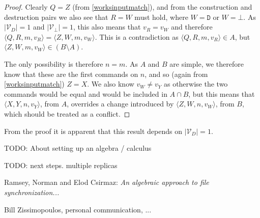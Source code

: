 \documentclass[12pt]{article}
\newcommand{\setvx}[1]{\mathcal{V}_{#1}} %
\newcommand{\setd}{\setvx{D}} %
\newcommand{\setb}{\setvx{\empt}} %
\newcommand{\empt}{\bot}
\newcommand{\ccharb}{\empt}
\newcommand{\cchard}{\mathtt{D}}
\newcommand{\valvy}{v_Y} %
\newcommand{\valvw}{v_W}
\newcommand{\valvr}{v_R}
\newcommand{\caaaa}[4]{\langle{#1,#2,#3,#4}\rangle}
\newcommand{\cxynv}{\caaaa{X}{Y}{n}{\valvy}}
\newcommand{\czwnv}{\caaaa{Z}{W}{n}{\valvw}}
\newcommand{\czwmv}{\caaaa{Z}{W}{m}{\valvw}}
\newcommand{\cqrmv}{\caaaa{Q}{R}{m}{\valvr}}
\newcommand{\bma}{(B\setminus A)}
\theoremstyle{definition}
\begin{document}
\begin{proof}
Clearly $Q=Z$ (from \cref{worksinputmatch}), and from the construction and destruction
pairs we also see that $R=W$ must hold, where $W=\cchard$ or $W=\ccharb$.
As $|\setd|=1$ and $|\setb|=1$, this also means that $v_R=v_W$ and therefore
$\cqrmv = \czwmv$.
This is a contradiction as $\cqrmv\in A$, but $\czwmv\in\bma$.

The only possibility is therefore $n=m$.
As $A$ and $B$ are simple, we therefore know that these are the first commands on $n$,
and so (again from \cref{worksinputmatch}) $Z=X$.
We also know $\valvw\neq\valvy$ as otherwise the two commands would be equal and
would be included in $A\cap B$,
but this means that $\cxynv$, from $A$, overrides a change introduced 
by $\czwnv$, from $B$, which should be treated as a conflict.
\end{proof}

From the proof it is apparent that this result depends on $|\setd|=1$.


TODO: About setting up an algebra / calculus

TODO: next steps. multiple replicas

\begin{thebibliography}{99}

 Ramsey, Norman and Elod Csirmaz: {\it An algebraic approach to
file synchronization...}

 Bill Zissimopoulos, personal communication, ...

\end{thebibliography}
\end{document}
